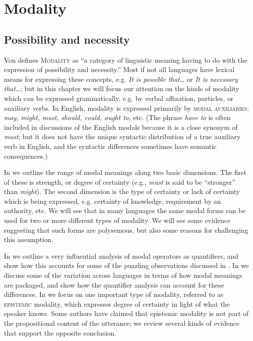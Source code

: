 \chapter{Modality}\label{sec:16}

\section{Possibility and necessity}\label{sec:16.1}

Von \citet{Fintel2006} defines \textsc{Modality} as “a category of linguistic meaning having to do with the expression of possibility and necessity.” Most if not all languages have lexical means for expressing these concepts, e.g. \textit{It is possible that…} or \textit{It is necessary} \textit{that…}; but in this chapter we will focus our attention on the kinds of modality which can be expressed grammatically, e.g. by verbal affixation, particles, or auxiliary verbs. In English, modality is expressed primarily by \textsc{modal auxiliaries}: \textit{may, might, must, should, could, ought to,} etc. (The phrase \textit{have to} is often included in discussions of the English modals because it is a close synonym of \textit{must}; but it does not have the unique syntactic distribution of a true auxiliary verb in English, and the syntactic differences sometimes have semantic consequences.)



In  we outline the range of modal meanings along two basic dimensions. The first of these is strength, or degree of certainty (e.g., \textit{must} is said to be “stronger” than \textit{might}). The second dimension is the type of certainty or lack of certainty which is being expressed, e.g. certainty of knowledge, requirement by an authority, etc. We will see that in many languages the same modal forms can be used for two or more different types of modality. We will see some evidence suggesting that such forms are polysemous, but also some reasons for challenging this assumption.



In  we outline a very influential analysis of modal operators as quantifiers, and show how this accounts for some of the puzzling observations discussed in . In  we discuss some of the variation across languages in terms of how modal meanings are packaged, and show how the quantifier analysis can account for these differences. In  we focus on one important type of modality, referred to as \textsc{epistemic} modality, which expresses degree of certainty in light of what the speaker knows. Some authors have claimed that epistemic modality is not part of the propositional content of the utterance; we review several kinds of evidence that support the opposite conclusion.


